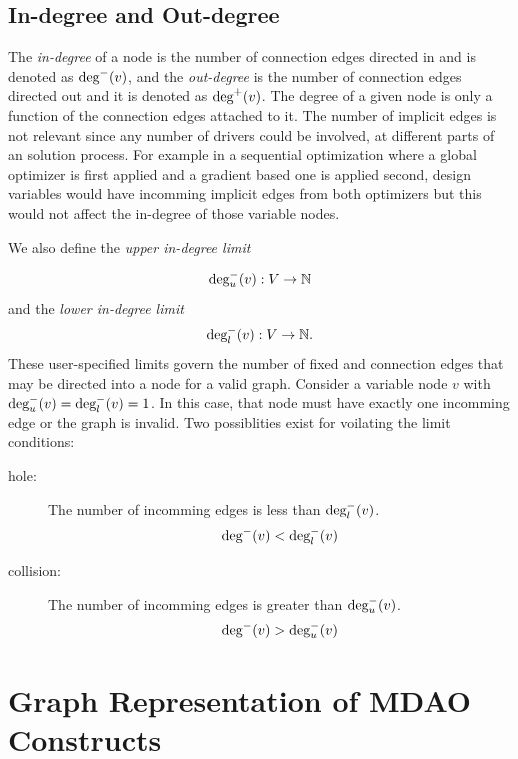 \subsection{In-degree and Out-degree}
\label{s:indegree-outdegree}
The \emph{in-degree} of a node is the number of connection edges directed in and 
is denoted as $\textrm{deg}^-(v)$, and the \emph{out-degree} 
is the number of connection edges directed out and it is denoted as $\textrm{deg}^+(v)$.
The degree of a given node is only a function of the connection edges 
attached to it. The number of implicit edges is not relevant since any number 
of drivers could be involved, at different parts of an solution process. For 
example in a sequential optimization where a global optimizer is first applied
and a gradient based one is applied second, design variables would have incomming 
implicit edges from both optimizers but this would not affect the in-degree of those
variable nodes. 

We also define the \emph{upper in-degree limit} 

\begin{equation}
\textrm{deg}_u^-(v):V \to \mathbb{N}
\end{equation} 
and the \emph{lower in-degree limit}
\begin{equation}
\textrm{deg}_l^-(v):V \to \mathbb{N}.
\end{equation}
These user-specified limits govern the number of fixed and connection edges that 
may be directed into a node for a valid graph. Consider a variable node $v$ with
$\textrm{deg}_u^-(v) = \textrm{deg}_l^-(v) = 1$. In this case, that node must have exactly one
incomming edge or the graph is invalid. Two possiblities exist for voilating 
the limit conditions: 
\begin{description}
  \item[hole: ] The number of incomming edges is less than $\textrm{deg}_l^-(v)$. 
    \begin{equation} \textrm{deg}^-(v) < \textrm{deg}_l^-(v) \label{e:hole} \end{equation} 

  \item[collision: ] The number of incomming edges is greater than $ \textrm{deg}_u^-(v)$. 
    \begin{equation} \textrm{deg}^-(v) > \textrm{deg}_u^-(v) \label{e:collision} \end{equation}
\end{description} 

\section{Graph Representation of MDAO Constructs}

